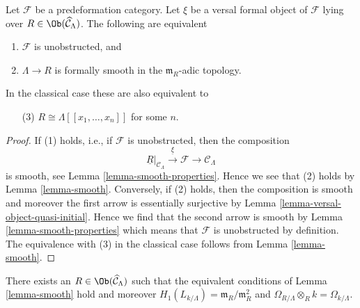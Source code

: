 \begin{lemma}
\label{lemma-smooth-power-series-classical}
Let $\mathcal{F}$ be a predeformation category.
Let $\xi$ be a versal formal object of $\mathcal{F}$ lying over
$R \in \Ob(\widehat{\mathcal{C}}_\Lambda)$. The following are
equivalent
\begin{enumerate}
\item $\mathcal{F}$ is unobstructed, and
\item $\Lambda \to R$ is formally smooth in the $\mathfrak m_R$-adic topology.
\end{enumerate}
In the classical case these are also equivalent to
\begin{enumerate}
\item[(3)] $R \cong \Lambda[[x_1, \ldots, x_n]]$ for some $n$.\
\end{enumerate}
\end{lemma}

\begin{proof}
If (1) holds, i.e., if $\mathcal{F}$ is unobstructed, then the composition
$$
\underline{R}|_{\mathcal{C}_\Lambda}
\xrightarrow{\underline{\xi}}
\mathcal{F}
\to
\mathcal{C}_\Lambda
$$
is smooth, see Lemma \ref{lemma-smooth-properties}.
Hence we see that (2) holds by Lemma \ref{lemma-smooth}.
Conversely, if (2) holds, then the composition is smooth
and moreover the first arrow is essentially surjective by
Lemma \ref{lemma-versal-object-quasi-initial}. Hence we
find that the second arrow is smooth by Lemma \ref{lemma-smooth-properties}
which means that $\mathcal{F}$ is unobstructed by definition.
The equivalence with (3) in the classical case follows
from Lemma \ref{lemma-smooth}.
\end{proof}

\begin{lemma}
\label{lemma-exists-smooth}
There exists an $R \in \Ob(\widehat{\mathcal{C}}_\Lambda)$
such that the equivalent conditions of Lemma \ref{lemma-smooth}
hold and moreover $H_1(L_{k/\Lambda}) = \mathfrak m_R/\mathfrak m_R^2$
and $\Omega_{R/\Lambda} \otimes_R k = \Omega_{k/\Lambda}$.
\end{lemma}


